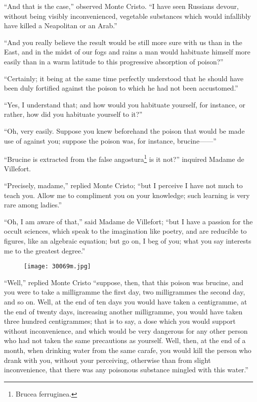 “And that is the case,” observed Monte Cristo. “I have seen Russians
devour, without being visibly inconvenienced, vegetable substances
which would infallibly have killed a Neapolitan or an Arab.”

“And you really believe the result would be still more sure with us
than in the East, and in the midst of our fogs and rains a man would
habituate himself more easily than in a warm latitude to this
progressive absorption of poison?”

“Certainly; it being at the same time perfectly understood that he
should have been duly fortified against the poison to which he had not
been accustomed.”

“Yes, I understand that; and how would you habituate yourself, for
instance, or rather, how did you habituate yourself to it?”

“Oh, very easily. Suppose you knew beforehand the poison that would be
made use of against you; suppose the poison was, for instance,
brucine——”

“Brucine is extracted from the false angostura\footnote[8]{Brucea ferruginea.}
is it not?” inquired Madame de Villefort.

“Precisely, madame,” replied Monte Cristo; “but I perceive I have not
much to teach you. Allow me to compliment you on your knowledge; such
learning is very rare among ladies.”

“Oh, I am aware of that,” said Madame de Villefort; “but I have a
passion for the occult sciences, which speak to the imagination like
poetry, and are reducible to figures, like an algebraic equation; but
go on, I beg of you; what you say interests me to the greatest degree.”

\begin{figure}[ht]
\texttt{[image: 30069m.jpg]}
\end{figure}

“Well,” replied Monte Cristo “suppose, then, that this poison was
brucine, and you were to take a milligramme the first day, two
milligrammes the second day, and so on. Well, at the end of ten days
you would have taken a centigramme, at the end of twenty days,
increasing another milligramme, you would have taken three hundred
centigrammes; that is to say, a dose which you would support without
inconvenience, and which would be very dangerous for any other person
who had not taken the same precautions as yourself. Well, then, at the
end of a month, when drinking water from the same carafe, you would
kill the person who drank with you, without your perceiving, otherwise
than from slight inconvenience, that there was any poisonous substance
mingled with this water.”

